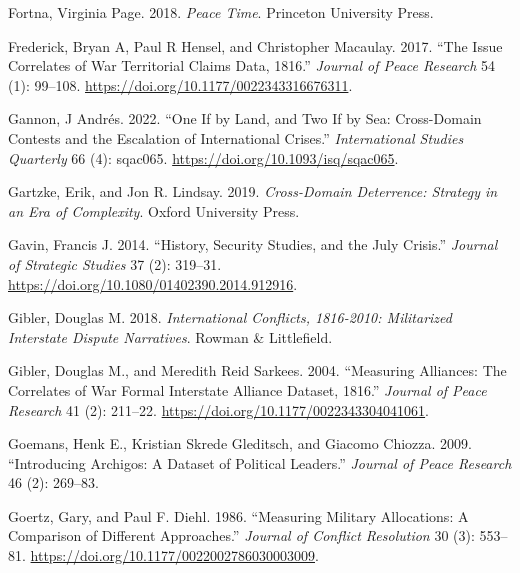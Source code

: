\documentclass{article}
\newlength{\cslhangindent}
\newlength{\cslentryspacingunit} %
\newenvironment{CSLReferences}[2] %
 {%
  \setlength{\parindent}{0pt}
  \ifodd #1
  \let\oldpar\par
  \def\par{\hangindent=\cslhangindent\oldpar}
  \fi
  \setlength{\parskip}{#2\cslentryspacingunit}
 }%
 {}
\begin{document}
\begin{CSLReferences}{1}{0}
\leavevmode{}%
Fortna, Virginia Page. 2018. \emph{Peace Time}. {Princeton University
Press}.

\leavevmode{}%
Frederick, Bryan A, Paul R Hensel, and Christopher Macaulay. 2017.
{``The {Issue Correlates} of {War Territorial Claims Data},
1816.''} \emph{Journal of Peace Research} 54 (1):
99--108. \url{https://doi.org/10.1177/0022343316676311}.

\leavevmode{}%
Gannon, J Andrés. 2022. {``One If by {Land}, and {Two} If by {Sea}:
{Cross-Domain Contests} and the {Escalation} of {International
Crises}.''} \emph{International Studies Quarterly} 66 (4): sqac065.
\url{https://doi.org/10.1093/isq/sqac065}.

\leavevmode{}%
Gartzke, Erik, and Jon R. Lindsay. 2019. \emph{Cross-{Domain
Deterrence}: {Strategy} in an {Era} of {Complexity}}. {Oxford University
Press}.

\leavevmode{}%
Gavin, Francis J. 2014. {``History, {Security Studies}, and the {July
Crisis}.''} \emph{Journal of Strategic Studies} 37 (2): 319--31.
\url{https://doi.org/10.1080/01402390.2014.912916}.

\leavevmode{}%
Gibler, Douglas M. 2018. \emph{International {Conflicts}, 1816-2010:
{Militarized Interstate Dispute Narratives}}. {Rowman \& Littlefield}.

\leavevmode{}%
Gibler, Douglas M., and Meredith Reid Sarkees. 2004. {``Measuring
{Alliances}: The {Correlates} of {War Formal Interstate Alliance}
{Dataset}, 1816.''} \emph{Journal of Peace Research} 41
(2): 211--22. \url{https://doi.org/10.1177/0022343304041061}.

\leavevmode{}%
Goemans, Henk E., Kristian Skrede Gleditsch, and Giacomo Chiozza. 2009.
{``Introducing {Archigos}: {A} Dataset of Political Leaders.''}
\emph{Journal of Peace Research} 46 (2): 269--83.

\leavevmode{}%
Goertz, Gary, and Paul F. Diehl. 1986. {``Measuring {Military
Allocations}: {A Comparison} of {Different Approaches}.''} \emph{Journal
of Conflict Resolution} 30 (3): 553--81.
\url{https://doi.org/10.1177/0022002786030003009}.


\end{CSLReferences}
\end{document}

